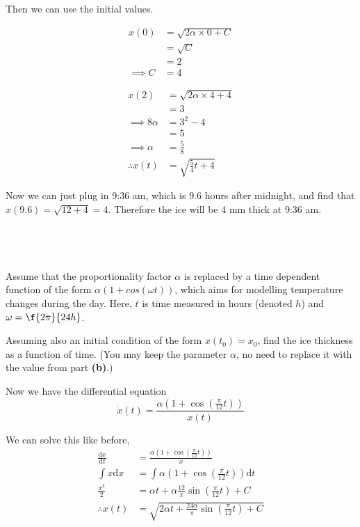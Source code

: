 \documentclass[a4paper]{article}
\begin{document}
Then we can use the initial values.

\begin{align*}
	x(0) &= \sqrt{2 \alpha \times 0 + C}\\
		 &= \sqrt C\\
		 &= 2\\
	\implies C &= 4
\end{align*}

\begin{align*}
	x(2) &= \sqrt{2 \alpha \times 4 + 4}\\
		 &= 3\\
	\implies 8 \alpha &= 3^2 - 4\\
					  &= 5\\
	\implies \alpha &= \frac58\\
	\therefore x(t) &= \sqrt{\frac54 t + 4}
\end{align*}

Now we can just plug in 9:36 am, which is $9.6$ hours after midnight, and find that $x(9.6) = \sqrt{12 + 4} = 4$. Therefore the ice will be 4 mm thick at 9:36 am.

\subsection{~} %

\begin{questionbody}
Assume that the proportionality factor $\alpha$ is replaced by a time dependent function of the form $\alpha(1 + cos(\omega t))$, which aims for modelling temperature changes during the day. Here, $t$ is time measured in hours (denoted $h$) and $\omega = \f{2\pi}{24h}$.

Assuming also an initial condition of the form $x(t_0) = x_0$, find the ice thickness as a function of time. (You may keep the parameter $\alpha$, no need to replace it with the value from part \textbf{(b)}.)
\end{questionbody}

Now we have the differential equation $$\dot x(t) = \frac{\alpha \left(1 + \cos\left( \frac{\pi}{12} t \right)\right)}{x(t)}$$

We can solve this like before, \begin{align*}
	\frac{\mathrm d x}{\mathrm d t} &= \frac{\alpha \left(1 + \cos\left( \frac{\pi}{12} t \right)\right)}{x}\\[1ex]
	\int x \mathrm d x &= \int \alpha \left( 1 + \cos\left(\frac{\pi}{12} t\right) \right) \mathrm d t\\[1ex]
	\frac{x^2}{2} &= \alpha t + \alpha \frac{12}{\pi} \sin \left(\frac{\pi}{12} t\right) + C\\[1ex]
	\therefore x(t) &= \sqrt{2\alpha t + \frac{24\alpha}{\pi} \sin \left(\frac{\pi}{12} t\right) + C}
\end{align*}
\end{document}
